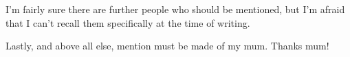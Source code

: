 I'm fairly sure there are further people who should be mentioned, but I'm afraid that I can't recall them specifically at the time of writing.



Lastly, and above all else, mention must be made of my mum.  Thanks mum!